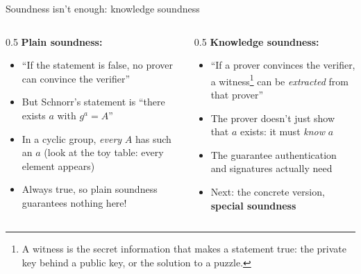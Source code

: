 \ifdefined\PRESENTATION\else\PassOptionsToClass{handout}{beamer}\fi\documentclass[aspectratio=169, lualatex]{beamer}
\begin{document}
\begin{frame}{Soundness isn't enough: knowledge soundness}
	\begin{columns}[c]
		\begin{column}{0.5\textwidth}
			\textbf{Plain soundness:}
			\begin{itemize}
				\item ``If the statement is false, no prover can convince the verifier''
				\item But Schnorr's statement is ``there exists $a$ with $g^a = A$''
				\item In a cyclic group, \textit{every} $A$ has such an $a$ (look at the toy table: every element appears)
				\item Always true, so plain soundness guarantees nothing here!
			\end{itemize}
		\end{column}
		\begin{column}{0.5\textwidth}
			\textbf{Knowledge soundness:}
			\begin{itemize}
				\item ``If a prover convinces the verifier, a witness\footnote{A witness is the secret information that makes a statement true: the private key behind a public key, or the solution to a puzzle.} can be \textit{extracted} from that prover''
				\item The prover doesn't just show that $a$ exists: it must \textit{know} $a$
				\item The guarantee authentication and signatures actually need
				\item Next: the concrete version, \textbf{special soundness}
			\end{itemize}
		\end{column}
	\end{columns}
\end{frame}
\end{document}
